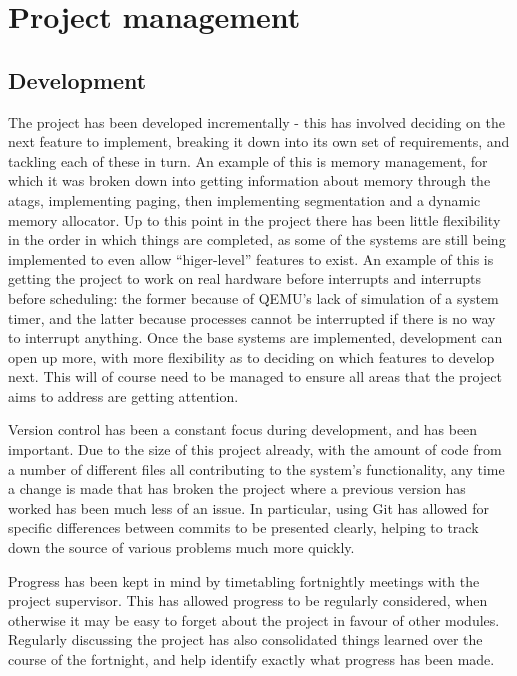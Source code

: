 \documentclass[10pt,a4paper]{article}
\begin{document}

\section{Project management}
\subsection{Development}
The project has been developed incrementally - this has involved deciding on the
next feature to implement, breaking it down into its own set of requirements,
and tackling each of these in turn. An example of this is memory management, for
which it was broken down into getting information about memory through the
atags, implementing paging, then implementing segmentation and a dynamic memory
allocator. Up to this point in the project there has been little flexibility
in the order in which things are completed, as some of the systems are still
being implemented to even allow ``higer-level'' features to exist. An example of
this is getting the project to work on real hardware before interrupts and
interrupts before scheduling: the former because of QEMU's lack of simulation of a
system timer, and the latter because processes cannot be interrupted if there is
no way to interrupt anything. Once the base systems are implemented, development
can open up more, with more flexibility as to deciding on which features to
develop next. This will of course need to be managed to ensure all areas that
the project aims to address are getting attention.

Version control has been a constant focus during development, and has been
important. Due to the size of this project already, with the amount of code from
a number of different files all contributing to the system's functionality, any
time a change is made that has broken the project where a previous version has
worked has been much less of an issue. In particular, using Git has allowed for
specific differences between commits to be presented clearly, helping to track
down the source of various problems much more quickly.

Progress has been kept in mind by timetabling fortnightly meetings with the
project supervisor. This has allowed progress to be regularly considered, when
otherwise it may be easy to forget about the project in favour of other modules.
Regularly discussing the project has also consolidated things learned over the
course of the fortnight, and help identify exactly what progress has been made.
\end{document}
